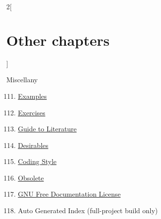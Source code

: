 \begin{multicols}{2}[\section{Other chapters}]
\begin{enumerate}
\end{enumerate}
Miscellany
\begin{enumerate}
\setcounter{enumi}{110}
\item \hyperref[examples-section-phantom]{Examples}
\item \hyperref[exercises-section-phantom]{Exercises}
\item \hyperref[guide-section-phantom]{Guide to Literature}
\item \hyperref[desirables-section-phantom]{Desirables}
\item \hyperref[coding-section-phantom]{Coding Style}
\item \hyperref[obsolete-section-phantom]{Obsolete}
\item \hyperref[fdl-section-phantom]{GNU Free Documentation License}
\item Auto Generated Index (full-project build only)
\end{enumerate}
\end{multicols}
